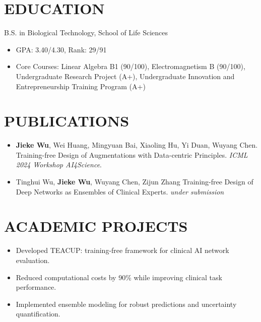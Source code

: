 \documentclass{resume}
\begin{document}



\section{EDUCATION}

B.S. in Biological Technology, School of Life Sciences
\begin{itemize}
	\item GPA: 3.40/4.30, Rank: 29/91
	\item Core Courses: Linear Algebra B1 (90/100), Electromagnetism B (90/100), Undergraduate Research Project (A+), Undergraduate Innovation and Entrepreneurship Training Program (A+)
\end{itemize}

\section{PUBLICATIONS}
\begin{itemize}
	\item \textbf{Jieke Wu}, Wei Huang, Mingyuan Bai, Xiaoling Hu, Yi Duan, Wuyang Chen. Training-free Design of Augmentations with Data-centric Principles. \emph{ICML 2024 Workshop AI4Science}.
	\item Tinghui Wu, \textbf{Jieke Wu}, Wuyang Chen, Zijun Zhang Training-free Design of Deep Networks as  Ensembles of Clinical Experts. \emph{under submission}
\end{itemize}

\section{ACADEMIC PROJECTS}

\begin{itemize}
	\item Developed TEACUP: training-free framework for clinical AI network evaluation.
	\item Reduced computational costs by 90\% while improving clinical task performance.
	\item Implemented ensemble modeling for robust predictions and uncertainty quantification.
\end{itemize}
\end{document}
